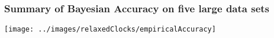 \begin{frame}
\frametitle{Summary of Bayesian Accuracy on five large data sets}

\begin{centering}

\texttt{[image: ../images/relaxedClocks/empiricalAccuracy]}

\end{centering}

\end{frame}
